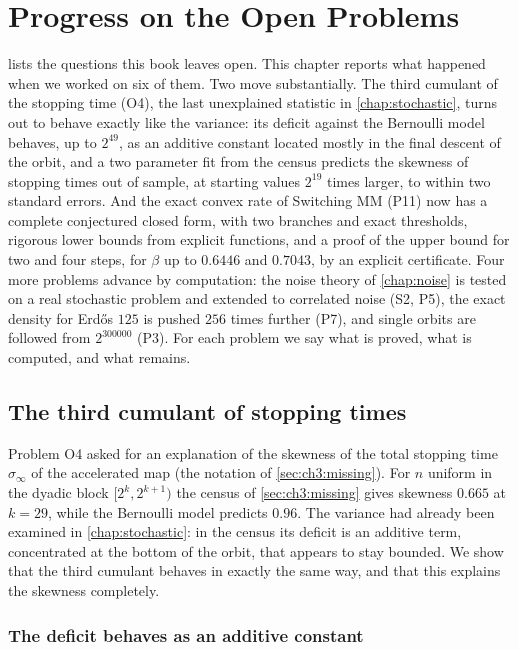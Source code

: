 \chapter{Progress on the Open Problems}\label{chap:progress}

 lists the questions this book leaves open. This chapter
reports what happened when we worked on six of them. Two move substantially.
The third cumulant of the stopping time (O4), the last unexplained statistic in
\cref{chap:stochastic}, turns out to behave exactly like the variance: its
deficit against the Bernoulli model behaves, up to $2^{49}$, as an additive constant located mostly in the
final descent of the orbit, and a two parameter fit from the census predicts
the skewness of stopping times out of sample, at starting values $2^{19}$ times
larger, to within two standard errors. And the exact convex rate of Switching
MM (P11) now has a complete conjectured closed form, with two branches and
exact thresholds, rigorous lower bounds from explicit functions, and a proof
of the upper bound for two and four steps, for $\beta$ up to $0.6446$ and $0.7043$, by an explicit certificate. Four
more problems advance by computation: the noise theory of \cref{chap:noise}
is tested on a real stochastic problem and extended to correlated noise (S2,
P5), the exact density for Erd\H{o}s $125$ is pushed $256$ times further (P7),
and single orbits are followed from $2^{300000}$ (P3). For each problem we say
what is proved, what is computed, and what remains.

\section{The third cumulant of stopping times}\label{sec:ch16:o4}

Problem O4 asked for an explanation of the skewness of the total stopping time
$\sigma_\infty$ of the accelerated map (the notation of \cref{sec:ch3:missing}). For $n$ uniform in the dyadic block
$[2^k,2^{k+1})$ the census of \cref{sec:ch3:missing} gives skewness $0.665$ at
$k=29$, while the Bernoulli model predicts $0.96$. The variance had already
been examined in \cref{chap:stochastic}: in the census its deficit is an additive term,
concentrated at the bottom of the orbit, that appears to stay bounded. We show that the third cumulant
behaves in exactly the same way, and that this explains the skewness
completely.

\subsection{The deficit behaves as an additive constant}

